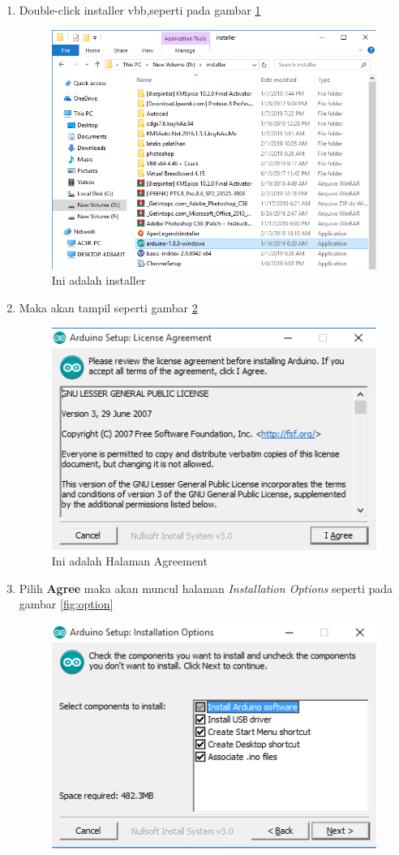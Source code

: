 \begin{enumerate}
\begin{enumerate}
        \item Double-click installer vbb,seperti pada gambar \ref{fig:installer}
            \begin{figure}[!htbp]
            \centering
            \includegraphics[width=.75\textwidth]{figures/IDE/installer.png}
            \caption{Ini adalah installer}\label{fig:installer}
            \end{figure}
        \item Maka akan tampil seperti gambar \ref{fig:agreement}
            \begin{figure}[!htbp]
            \centering
            \includegraphics[width=.75\textwidth]{figures/IDE/agreement.png}
            \caption{Ini adalah Halaman Agreement}\label{fig:agreement}
            \end{figure}
        \item Pilih \textbf{Agree} maka akan muncul halaman \textit{Installation Options} seperti pada gambar \ref{fig:option}
            \begin{figure}[!htbp]
            \centering
            \includegraphics[width=.75\textwidth]{figures/IDE/option.png}

\end{figure}
\end{enumerate}
\end{enumerate}
